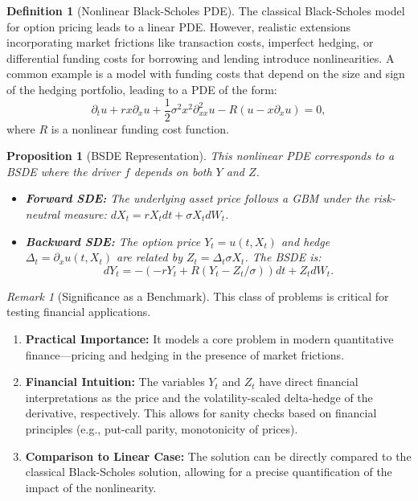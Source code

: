 \documentclass[11pt,letterpaper,oneside]{article}
\theoremstyle{plain}
\newtheorem{proposition}[theorem]{Proposition}
\theoremstyle{definition}
\newtheorem{definition}[theorem]{Definition}
\theoremstyle{remark}
\newtheorem{remark}{Remark}[section]
\begin{document}
\begin{definition}[Nonlinear Black-Scholes PDE]
The classical Black-Scholes model for option pricing leads to a linear PDE. However, realistic extensions incorporating market frictions like transaction costs, imperfect hedging, or differential funding costs for borrowing and lending introduce nonlinearities. A common example is a model with funding costs that depend on the size and sign of the hedging portfolio, leading to a PDE of the form:
\begin{equation}
    \partial_t u + r x \partial_x u + \frac{1}{2}\sigma^2 x^2 \partial_{xx}^2 u - R(u - x\partial_x u) = 0,
\end{equation}
where \(R\) is a nonlinear funding cost function.
\end{definition}

\begin{proposition}[BSDE Representation]
This nonlinear PDE corresponds to a BSDE where the driver \(f\) depends on both \(Y\) and \(Z\).
\begin{itemize}
    \item \textbf{Forward SDE:} The underlying asset price follows a GBM under the risk-neutral measure: \(dX_t = r X_t dt + \sigma X_t dW_t\).
    \item \textbf{Backward SDE:} The option price \(Y_t = u(t,X_t)\) and hedge \(\Delta_t = \partial_x u(t,X_t)\) are related by \(Z_t = \Delta_t \sigma X_t\). The BSDE is:
    \[ dY_t = -(-r Y_t + R(Y_t - Z_t/\sigma))dt + Z_t dW_t. \]
\end{itemize}
\end{proposition}

\begin{remark}[Significance as a Benchmark]
This class of problems is critical for testing financial applications.
\begin{enumerate}
    \item \textbf{Practical Importance:} It models a core problem in modern quantitative finance—pricing and hedging in the presence of market frictions.
    \item \textbf{Financial Intuition:} The variables \(Y_t\) and \(Z_t\) have direct financial interpretations as the price and the volatility-scaled delta-hedge of the derivative, respectively. This allows for sanity checks based on financial principles (e.g., put-call parity, monotonicity of prices).
    \item \textbf{Comparison to Linear Case:} The solution can be directly compared to the classical Black-Scholes solution, allowing for a precise quantification of the impact of the nonlinearity.
\end{enumerate}
\end{remark}
\end{document}
